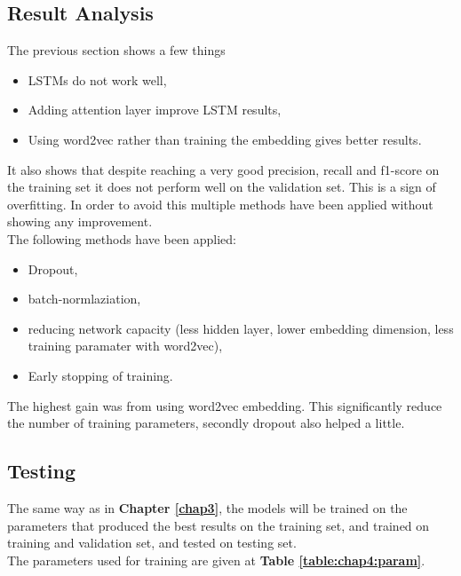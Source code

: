 \subsection{Result Analysis}
The previous section shows a few things
\begin{itemize}
	\item LSTMs do not work well,
	\item Adding attention layer improve LSTM results,
	\item Using word2vec rather than training the embedding gives better results.
\end{itemize}

It also shows that despite reaching a very good precision, recall and f1-score on the training set it does not perform well on the validation set. This is a sign of overfitting. In order to avoid this multiple methods have been applied without showing any improvement. \\
{}
The following methods have been applied: 
\begin{itemize}
	\item Dropout\cite{srivastava2014dropout}, 
	\item batch-normlaziation\cite{Ioffe2015},
	\item reducing network capacity (less hidden layer, lower embedding dimension, less training paramater with word2vec),
	\item Early stopping of training.
\end{itemize}

The highest gain was from using word2vec embedding. This significantly reduce the number of training parameters, secondly dropout also helped a little. 

\subsection{Testing}

The same way as in \textbf{Chapter \ref{chap3}}, the models will be trained on the parameters that produced the best results on the training set, and trained on training and validation set, and tested on testing set. \\

The parameters used for training are given at \textbf{Table \ref{table:chap4:param}}.

